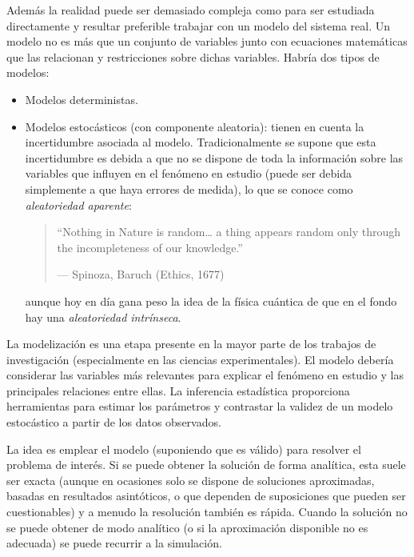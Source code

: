 \documentclass[
]{book}
\theoremstyle{break}
\theoremstyle{definition}
\theoremstyle{definition}
\theoremstyle{definition}
\theoremstyle{remark}
\begin{document}
Además la realidad puede ser demasiado compleja como para ser estudiada directamente y resultar preferible trabajar con un modelo del sistema real.
Un modelo no es más que un conjunto de variables junto con ecuaciones matemáticas que las relacionan y restricciones sobre dichas variables.
Habría dos tipos de modelos:

\begin{itemize}
\item
  Modelos deterministas.
\item
  Modelos estocásticos (con componente aleatoria): tienen en cuenta la incertidumbre asociada al modelo. Tradicionalmente se supone que esta incertidumbre es debida a que no se dispone de toda la información sobre las variables que influyen en el fenómeno en estudio (puede ser debida simplemente a que haya errores de medida), lo que se conoce como \emph{aleatoriedad aparente}:

  \begin{quote}
  ``Nothing in Nature is random\ldots{} a thing appears random only through the incompleteness of our knowledge.''

  --- Spinoza, Baruch (Ethics, 1677)
  \end{quote}

  aunque hoy en día gana peso la idea de la física cuántica de que en el fondo hay una \emph{aleatoriedad intrínseca}.
\end{itemize}

La modelización es una etapa presente en la mayor parte de los trabajos de investigación (especialmente en las ciencias experimentales).
El modelo debería considerar las variables más relevantes para explicar el fenómeno en estudio y las principales relaciones entre ellas.
La inferencia estadística proporciona herramientas para estimar los parámetros y contrastar la validez de un modelo estocástico a partir de los datos observados.

La idea es emplear el modelo (suponiendo que es válido) para resolver el problema de interés.
Si se puede obtener la solución de forma analítica, esta suele ser exacta (aunque en ocasiones solo se dispone de soluciones aproximadas, basadas en resultados asintóticos, o que dependen de suposiciones que pueden ser cuestionables) y a menudo la resolución también es rápida.
Cuando la solución no se puede obtener de modo analítico (o si la aproximación disponible no es adecuada) se puede recurrir a la simulación.
\end{document}
